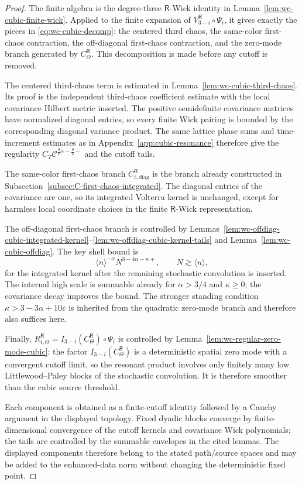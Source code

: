 \documentclass[10pt]{amsart}
\numberwithin{equation}{section}
\theoremstyle{plain}
\theoremstyle{definition}
\theoremstyle{remark}
\newcommand{\eps}{\varepsilon}
\begin{document}
\begin{proof}
The finite algebra is the degree-three $\mathsf R$-Wick identity in Lemma~\ref{lem:wc-cubic-finite-wick}.  Applied to the finite expansion of $V_{3-i}^{\mathsf R}\circ\Psi_i$, it gives exactly the pieces in \eqref{eq:wc-cubic-decomp}: the centered third chaos, the same-color first-chaos contraction, the off-diagonal first-chaos contraction, and the zero-mode branch generated by $C_\Theta^{\mathsf R}$.  This decomposition is made before any cutoff is removed.

The centered third-chaos term is estimated in Lemma~\ref{lem:wc-cubic-third-chaos}.  Its proof is the independent third-chaos coefficient estimate with the local covariance Hilbert metric inserted.  The positive semidefinite covariance matrices have normalized diagonal entries, so every finite Wick pairing is bounded by the corresponding diagonal variance product.  The same lattice phase sums and time-increment estimates as in Appendix~\ref{app:cubic-resonance} therefore give the regularity $C_T\mathcal C^{\frac92\alpha-\frac92-}$ and the cutoff tails.

The same-color first-chaos branch $C_{i,\mathrm{diag}}^{\mathsf R}$ is the branch already constructed in Subsection~\ref{subsec:C-first-chaos-integrated}.  The diagonal entries of the covariance are one, so its integrated Volterra kernel is unchanged, except for harmless local coordinate choices in the finite $\mathsf R$-Wick representation.

The off-diagonal first-chaos branch is controlled by Lemmas~\ref{lem:wc-offdiag-cubic-integrated-kernel}--\ref{lem:wc-offdiag-cubic-kernel-tails} and Lemma~\ref{lem:wc-cubic-offdiag}.  The key shell bound is
\[
        \langle n\rangle^{-\alpha}N^{3-4\alpha-\kappa+},
        \qquad N\gtrsim\langle n\rangle,
\]
for the integrated kernel after the remaining stochastic convolution is inserted.  The internal high scale is summable already for $\alpha>3/4$ and $\kappa\ge0$; the covariance decay improves the bound.  The stronger standing condition $\kappa>3-3\alpha+10\eps$ is inherited from the quadratic zero-mode branch and therefore also suffices here.

Finally, $R_{i,\Theta}^{\mathsf R}=I_{3-i}(C_\Theta^{\mathsf R})\circ\Psi_i$ is controlled by Lemma~\ref{lem:wc-regular-zero-mode-cubic}: the factor $I_{3-i}(C_\Theta^{\mathsf R})$ is a deterministic spatial zero mode with a convergent cutoff limit, so the resonant product involves only finitely many low Littlewood--Paley blocks of the stochastic convolution.  It is therefore smoother than the cubic source threshold.

Each component is obtained as a finite-cutoff identity followed by a Cauchy argument in the displayed topology.  Fixed dyadic blocks converge by finite-dimensional convergence of the cutoff kernels and covariance Wick polynomials; the tails are controlled by the summable envelopes in the cited lemmas.  The displayed components therefore belong to the stated path/source spaces and may be added to the enhanced-data norm without changing the deterministic fixed point.
\end{proof}
\end{document}
